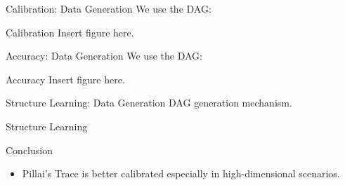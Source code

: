 \documentclass{beamer}
\begin{document}
\begin{frame}{Calibration: Data Generation}
	We use the DAG:
\end{frame}

\begin{frame}{Calibration}
	Insert figure here.
\end{frame}

\begin{frame}{Accuracy: Data Generation}
	We use the DAG:
\end{frame}

\begin{frame}{Accuracy}
	Insert figure here.
\end{frame}

\begin{frame}{Structure Learning: Data Generation}
	DAG generation mechanism.
\end{frame}

\begin{frame}{Structure Learning}
\end{frame}

\begin{frame}{Conclusion}
	\begin{itemize}
		\item Pillai's Trace is better calibrated especially in high-dimensional scenarios.
	\end{itemize}
\end{frame}
\end{document}
